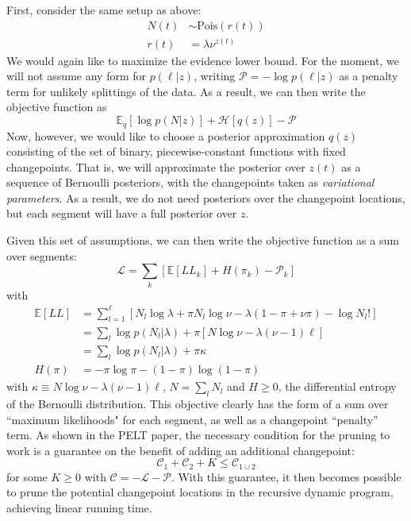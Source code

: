 \documentclass[11pt]{article}
\begin{document}
First, consider the same setup as above:
\begin{align}
    N(t) &\sim \mathrm{Pois}(r(t)) \\
    r(t) &= \lambda \nu^{z(t)}
\end{align}
We would again like to maximize the evidence lower bound. For the moment, we will not assume any form for $p(\ell|z)$, writing $\mathcal{P} = -\log p(\ell|z)$ as a penalty term for unlikely splittings of the data. As a result, we can then write the objective function as
\begin{equation}
    \mathbb{E}_q \left[\log p(N|z) \right] + \mathcal{H}[q(z)] - \mathcal{P}
\end{equation}
Now, however, we would like to choose a posterior approximation $q(z)$ consisting of the set of binary, piecewise-constant functions with fixed changepoints. That is, we will approximate the posterior over $z(t)$ as a sequence of Bernoulli posteriors, with the changepoints taken as \emph{variational parameters}. As a result, we do not need posteriors over the changepoint locations, but each segment will have a full posterior over $z$.

Given this set of assumptions, we can then write the objective function as a sum over segments:
\begin{equation}
    \mathcal{L} = \sum_k \left[
    \mathbb{E}[LL_k] + H(\pi_k)
    - \mathcal{P}_k
    \right]
\end{equation}
with
\begin{align}
    \mathbb{E}[LL] &= \sum_{l = 1}^\ell [N_l \log \lambda + \pi N_l \log \nu - \lambda (1 - \pi + \nu \pi) - \log N_l! ]\\
    &= \sum_l \log p(N_l|\lambda) + \pi [N\log \nu - \lambda (\nu - 1) \ell] \\
    &= \sum_l \log p(N_l|\lambda) + \pi \kappa \\
    H(\pi) &= -\pi \log \pi - (1 - \pi) \log (1 - \pi)
\end{align}
with $\kappa \equiv N\log \nu - \lambda (\nu - 1)\ell$, $N = \sum_l N_l$ and $H \ge 0$, the differential entropy of the Bernoulli distribution. This objective clearly has the form of a sum over ``maximum likelihoods" for each segment, as well as a changepoint ``penalty'' term. As shown in the PELT paper, the necessary condition for the pruning to work is a guarantee on the benefit of adding an additional changepoint:
\begin{equation}
    \label{pelt_condition}
    \mathcal{C}_1 + \mathcal{C}_2 + K \le \mathcal{C}_{1 \cup 2}
\end{equation}
for some $K \ge 0$ with $\mathcal{C} = -\mathcal{L} - \mathcal{P}$. With this guarantee, it then becomes possible to prune the potential changepoint locations in the recursive dynamic program, achieving linear running time.
\end{document}
